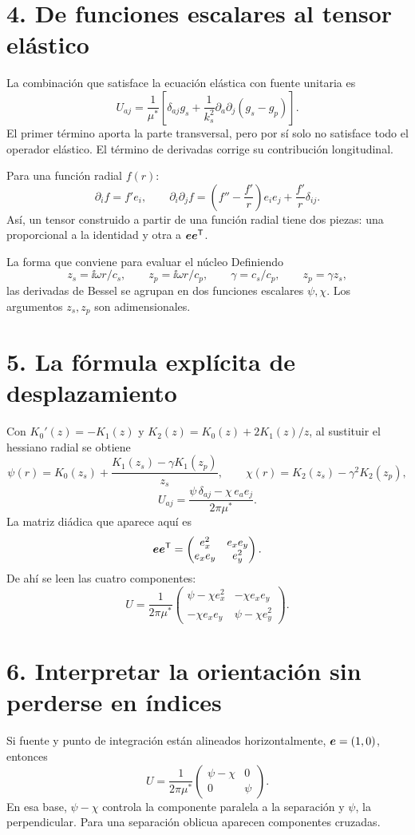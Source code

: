 \documentclass[11pt]{article}
\begin{document}
\section*{4. De funciones escalares al tensor elástico}
La combinación que satisface la ecuación elástica con fuente unitaria es
\[
 \boxed{U_{aj}=\frac1{\mu^*}
 \left[\delta_{aj}g_s+\frac1{k_s^2}
 \partial_a\partial_j(g_s-g_p)\right].}
\]
El primer término aporta la parte transversal, pero por sí solo no
satisface todo el operador elástico. El término de derivadas corrige su
contribución longitudinal.

Para una función radial \(f(r)\):
\[
 \partial_i f=f'e_i,\qquad
 \partial_i\partial_jf=
 \left(f''-\frac{f'}r\right)e_ie_j+\frac{f'}r\delta_{ij}.
\]
Así, un tensor construido a partir de una función radial tiene dos piezas:
una proporcional a la identidad y otra a \(\bm{e}\bm{e}^{\mathsf T}\).

\begin{resultado}{La forma que conviene para evaluar el núcleo}
Definiendo
\[
 z_s=\ii\omega r/c_s,\qquad z_p=\ii\omega r/c_p,\qquad
 \gamma=c_s/c_p,\qquad z_p=\gamma z_s,
\]
las derivadas de Bessel se agrupan en dos funciones escalares \(\psi,\chi\).
Los argumentos \(z_s,z_p\) son adimensionales.
\end{resultado}

\newpage
\section*{5. La fórmula explícita de desplazamiento}
Con \(K_0'(z)=-K_1(z)\) y
\(K_2(z)=K_0(z)+2K_1(z)/z\), al sustituir el hessiano radial se obtiene
\[
 \psi(r)=K_0(z_s)+\frac{K_1(z_s)-\gamma K_1(z_p)}{z_s},
 \qquad
 \chi(r)=K_2(z_s)-\gamma^2K_2(z_p),
\]
\[
 \boxed{U_{aj}=\frac{\psi\,\delta_{aj}-\chi\,e_ae_j}{2\pi\mu^*}.}
\]
La matriz diádica que aparece aquí es
\[
 \bm{e}\bm{e}^{\mathsf T}
 =\begin{pmatrix}e_x^2&e_xe_y\\e_xe_y&e_y^2\end{pmatrix}.
\]
De ahí se leen las cuatro componentes:
\[
 U=\frac1{2\pi\mu^*}
 \begin{pmatrix}
 \psi-\chi e_x^2&-\chi e_xe_y\\
 -\chi e_xe_y&\psi-\chi e_y^2
 \end{pmatrix}.
\]

\section*{6. Interpretar la orientación sin perderse en índices}
Si fuente y punto de integración están alineados horizontalmente,
\(\bm{e}=(1,0)\), entonces
\[
 U=\frac1{2\pi\mu^*}
 \begin{pmatrix}\psi-\chi&0\\0&\psi\end{pmatrix}.
\]
En esa base, \(\psi-\chi\) controla la componente paralela a la separación
y \(\psi\), la perpendicular. Para una separación oblicua aparecen
componentes cruzadas.
\end{document}
